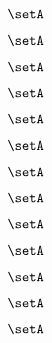 \begin{forslides}
    \begin{equation}
        \label{eq:slides-translation-66}
        \setA
    \end{equation}

    \begin{equation}
        \label{eq:slides-translation-67}
        \setA
    \end{equation}

    \begin{equation}
        \label{eq:slides-translation-68}
        \setA
    \end{equation}

    \begin{equation}
        \label{eq:slides-translation-69}
        \setA
    \end{equation}

    \begin{equation}
        \label{eq:slides-translation-70}
        \setA
    \end{equation}

    \begin{equation}
        \label{eq:slides-translation-71}
        \setA
    \end{equation}

    \begin{equation}
        \label{eq:slides-translation-72}
        \setA
    \end{equation}

    \begin{equation}
        \label{eq:slides-translation-73}
        \setA
    \end{equation}

    \begin{equation}
        \label{eq:slides-translation-74}
        \setA
    \end{equation}

    \begin{equation}
        \label{eq:slides-translation-75}
        \setA
    \end{equation}

    \begin{equation}
        \label{eq:slides-translation-76}
        \setA
    \end{equation}

    \begin{equation}
        \label{eq:slides-translation-77}
        \setA
    \end{equation}

    \begin{equation}
        \label{eq:slides-translation-78}
        \setA
    \end{equation}


\end{forslides}
